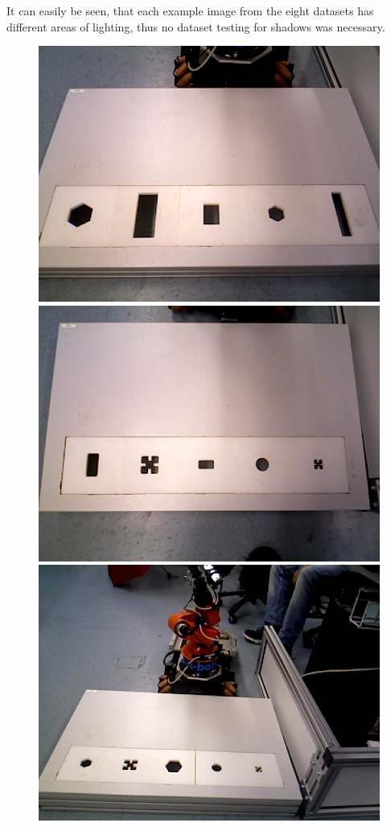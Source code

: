 \documentclass{article}
\begin{document}
It can easily be seen, that each example image from the eight datasets has different areas of lighting, thus no dataset testing for shadows was necessary.
\begin{figure}[h!]
\begin{minipage}{\textwidth}
\centering
\includegraphics[scale=0.15]{images/First_set.jpg}\hspace{0.1cm}
\includegraphics[scale=0.15]{images/Second_set.jpg}
\includegraphics[scale=0.15]{images/Third_set.jpg}

\end{minipage}
\end{figure}
\end{document}
